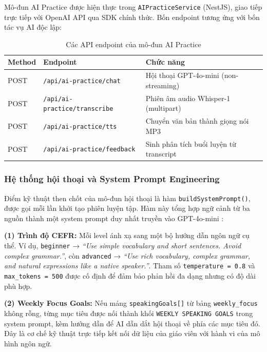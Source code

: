 Mô-đun AI Practice được hiện thực trong \texttt{AIPracticeService} (NestJS), giao tiếp trực tiếp với OpenAI API qua SDK chính thức. Bốn endpoint tương ứng với bốn tác vụ AI độc lập:

\begin{table}[H]
\centering
\begin{tabular}{|l|l|p{6cm}|}
\hline
\textbf{Method} & \textbf{Endpoint} & \textbf{Chức năng} \\ \hline
POST & \texttt{/api/ai-practice/chat} & Hội thoại GPT-4o-mini (non-streaming) \\ \hline
POST & \texttt{/api/ai-practice/transcribe} & Phiên âm audio Whisper-1 (multipart) \\ \hline
POST & \texttt{/api/ai-practice/tts} & Chuyển văn bản thành giọng nói MP3 \\ \hline
POST & \texttt{/api/ai-practice/feedback} & Sinh phân tích buổi luyện từ transcript \\ \hline
\end{tabular}
\caption{Các API endpoint của mô-đun AI Practice}
\end{table}

\subsubsection{Hệ thống hội thoại và System Prompt Engineering}

Điểm kỹ thuật then chốt của mô-đun hội thoại là hàm \texttt{buildSystemPrompt()}, được gọi mỗi lần khởi tạo phiên luyện tập. Hàm này tổng hợp ngữ cảnh từ ba nguồn thành một system prompt duy nhất truyền vào GPT-4o-mini \cite{openai_gpt4o}:

\textbf{(1) Trình độ CEFR:} Mỗi level ánh xạ sang một bộ hướng dẫn ngôn ngữ cụ thể. Ví dụ, \texttt{beginner} → \textit{``Use simple vocabulary and short sentences. Avoid complex grammar.''}, còn \texttt{advanced} → \textit{``Use rich vocabulary, complex grammar, and natural expressions like a native speaker.''}. Tham số \texttt{temperature = 0.8} và \texttt{max\_tokens = 500} được cố định để đảm bảo phản hồi đa dạng nhưng có độ dài phù hợp.

\textbf{(2) Weekly Focus Goals:} Nếu mảng \texttt{speakingGoals[]} từ bảng \texttt{weekly\_focus} không rỗng, từng mục tiêu được nối thành khối \texttt{WEEKLY SPEAKING GOALS} trong system prompt, kèm hướng dẫn để AI dẫn dắt hội thoại về phía các mục tiêu đó. Đây là cơ chế kỹ thuật trực tiếp kết nối dữ liệu của giáo viên với hành vi của mô hình ngôn ngữ.

